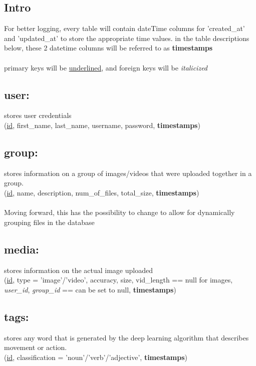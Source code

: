 \documentclass{scrreprt}
\begin{document}
\subsection{Intro}

For better logging, every table will contain dateTime columns for 'created\_at' and 'updated\_at' to store the appropriate time values. in the table descriptions below, these 2 datetime columns will be referred to as \textbf{timestamps}
\\\\
primary keys will be \underline{underlined}, and foreign keys will be \textit{italicized}

\subsection{user:}

stores user credentials
\\
(\underline{id}, first\_name, last\_name, username, password, \textbf{timestamps})

\subsection{group:}

stores information on a group of images/videos that were uploaded together in a group.
\\
(\underline{id}, name, description, num\_of\_files, total\_size, \textbf{timestamps})
\\\\
Moving forward, this has the possibility to change to allow for dynamically grouping files in the database


\subsection{media:}

stores information on the actual image uploaded
\\
(\underline{id}, type = 'image'/'video', accuracy, size, vid\_length == null for images, \textit{user\_id}, \textit{group\_id} == can be set to null, \textbf{timestamps})


\subsection{tags:}

stores any word that is generated by the deep learning algorithm that describes movement or action.
\\
(\underline{id}, classification = 'noun'/'verb'/'adjective', \textbf{timestamps})
\end{document}
